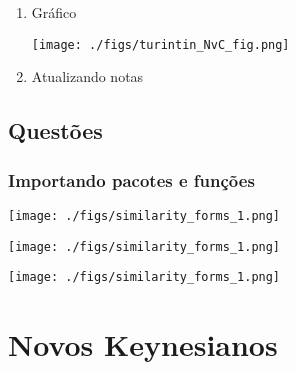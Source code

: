 \documentclass[11pt]{article}
\begin{document}
\begin{enumerate}
\item Gráfico
\label{sec:orgc601f4c}
\begin{center}
\texttt{[image: ./figs/turintin\_NvC\_fig.png]}
\end{center}

\item Atualizando notas
\label{sec:orgde9ceea}
\end{enumerate}

\subsection{Questões}
\label{sec:org1ab3ad0}



\subsubsection{Importando pacotes e funções}
\label{sec:org59dbe40}

\begin{center}
\texttt{[image: ./figs/similarity\_forms\_1.png]}
\end{center}
\begin{center}
\texttt{[image: ./figs/similarity\_forms\_1.png]}
\end{center}
\begin{center}
\texttt{[image: ./figs/similarity\_forms\_1.png]}
\end{center}





\section{Novos Keynesianos}
\label{sec:orgd382fb3}
\end{document}
